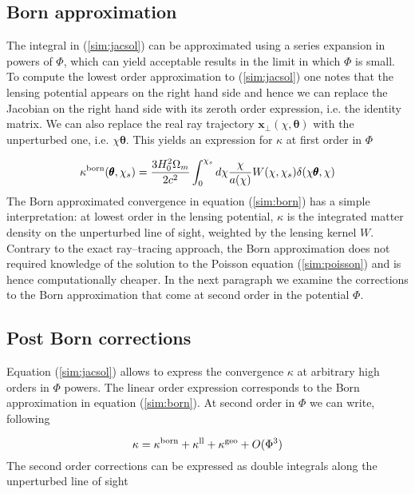 \documentclass[reprint,aps,prd,superscriptaddress,showkeys,showpacs]{revtex4-1}
\newcommand{\bb}[1]{\mathbf{#1}}
\newcommand\pt{\pmb{\theta}}
\begin{document}
\subsection{Born approximation}
The integral in (\ref{sim:jacsol}) can be approximated using a series expansion in powers of $\Phi$, which can yield acceptable results in the limit in which $\Phi$ is small. To compute the lowest order approximation to (\ref{sim:jacsol}) one notes that the lensing potential appears on the right hand side and hence we can replace the Jacobian on the right hand side with its zeroth order expression, i.e. the identity matrix. We can also replace the real ray trajectory $\bb{x}_\perp(\chi,\pt)$ with the unperturbed one, i.e. $\chi\pt$. This yields an expression for $\kappa$ at first order in $\Phi$

\begin{equation}
\label{sim:born}
\kappa^{\rm born}(\pt,\chi_s) = \frac{3H_0^2\Omega_m}{2c^2}\int_0^{\chi_s} d\chi\frac{\chi}{a(\chi)} W(\chi,\chi_s)\delta(\chi\pt,\chi)
\end{equation}
%
The Born approximated convergence in equation (\ref{sim:born}) has a simple interpretation: at lowest order in the lensing potential, $\kappa$ is the integrated matter density on the unperturbed line of sight, weighted by the lensing kernel $W$. Contrary to the exact ray--tracing approach, the Born approximation does not required knowledge of the solution to the Poisson equation (\ref{sim:poisson}) and is hence computationally cheaper. In the next paragraph we examine the corrections to the Born approximation that come at second order in the potential $\Phi$.  

\subsection{Post Born corrections}
Equation (\ref{sim:jacsol}) allows to express the convergence $\kappa$ at arbitrary high orders in $\Phi$ powers. The linear order expression corresponds to the Born approximation in equation (\ref{sim:born}). At second order in $\Phi$ we can write, following \citep{WLBispectrumDodelson}

\begin{equation}
\label{sim:pb2}
\kappa = \kappa^{\rm born} + \kappa^{\rm ll} + \kappa^{\rm geo} + O(\Phi^3)
\end{equation}
%
The second order corrections can be expressed as double integrals along the unperturbed line of sight
\end{document}
